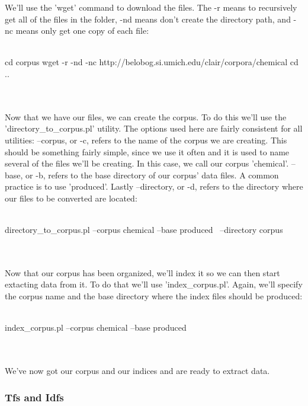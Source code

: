 We'll use the 'wget' command to download the files.  The -r means to recursively get all of the files in the folder, -nd means don't create the directory path, and -nc means only get one copy of each file:
\\
\\
\begin{boxedverbatim}
 cd corpus
 wget -r -nd -nc http://belobog.si.umich.edu/clair/corpora/chemical
 cd ..
\end{boxedverbatim}
\\
\\
Now that we have our files, we can create the corpus.  To do this we'll use the 'directory\_to\_corpus.pl' utility.  The options used here are fairly consistent for all utilities:  --corpus, or -c, refers to the name of the corpus we are creating.  This should be something fairly simple, since we use it often and it is used to name several of the files we'll be creating.  In this case, we call our corpus 'chemical'.  --base, or -b, refers to the base directory of our corpus' data files.  A common practice is to use 'produced'.  Lastly --directory, or -d, refers to the directory where our files to be converted are located:
\\
\\
\begin{boxedverbatim}
 directory_to_corpus.pl --corpus chemical --base produced \
  --directory corpus
\end{boxedverbatim}
\\
\\
Now that our corpus has been organized, we'll index it so we can then start extacting data from it.  To do that we'll use 'index\_corpus.pl'.  Again, we'll specify the corpus name and the base directory where the index files should be produced:
\\
\\
\begin{boxedverbatim}
 index_corpus.pl --corpus chemical --base produced
\end{boxedverbatim}
\\
\\
We've now got our corpus and our indices and are ready to extract data.

\subsubsection{Tfs and Idfs}


